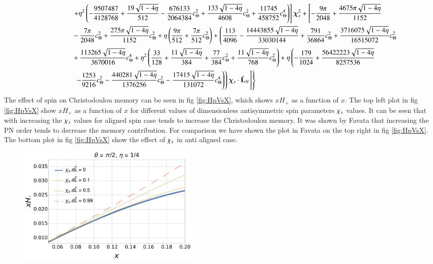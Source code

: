 \documentclass[twocolumn,showpacs,aps,prd,nobibnotes,floatfix]{revtex4-1}
\begin{document}
\begin{widetext}
\begin{subequations}
\begin{align}
	& \qquad\qquad\quad \left.+ \eta^2\left(-\frac{9507487}{4128768} + \frac{19\sqrt{1-4\eta}}{512} - \frac{676133}{2064384}c_{\Theta}^2 +\frac{133\sqrt{1-4\eta}}{4608}c_{\Theta}^2+ \frac{11745}{458752}c_{\Theta}^4\right)\right]\bm{\chi}_s^2 + \left[-\frac{9\pi}{2048} + \frac{4675\pi\sqrt{1-4\eta}}{1152}\right.\nonumber\\
	& \qquad\qquad\quad - \frac{7\pi}{2048}c_{\Theta}^2 + \frac{275\pi\sqrt{1-4\eta}}{1152}c_{\Theta}^2 + \eta\left(\frac{9\pi}{512} + \frac{7\pi}{512}c_{\Theta}^2\right) + \left(\frac{113}{4096} -\frac{14443855\sqrt{1-4\eta}}{33030144} + \frac{791}{36864}c_{\Theta}^2 + \frac{3716075\sqrt{1-4\eta}}{16515072}c_{\Theta}^2\right.\nonumber\\
	 & \qquad\qquad\quad +\frac{113265\sqrt{1-4\eta}}{3670016}c_{\Theta}^4 + \eta^2\left(\frac{33}{128} + \frac{11\sqrt{1-4\eta}}{384} + \frac{77}{384}c_{\Theta}^2 + \frac{11\sqrt{1-4\eta}}{768}c_{\Theta}^2\right) + \eta\left(-\frac{179}{1024} + \frac{56422223\sqrt{1-4\eta}}{8257536}\right.\nonumber\\
	 & \qquad\qquad\quad \left.\left.\left.\left. -\frac{1253}{9216}c_{\Theta}^2 -\frac{440281\sqrt{1-4\eta}}{1376256}c_{\Theta}^2 -\frac{17415\sqrt{1-4\eta}}{131072}c_{\Theta}^4\right)\right)\bm{\chi}_s \cdot \hat{\mathbf{L}}_N\right]\right\}
\end{align}
\end{subequations}
The effect of spin on Christodoulou memory can be seen in fig \ref{fig:HpVsX}, which shows $xH_+$ as a function of $x$. The top left plot in fig \ref{fig:HpVsX} show $xH_+$ as a function of $x$ for different values of dimensionless antisymmetric spin parameters $\chi_s$ values. It can be seen that with increasing the $\chi_s$ values for aligned spin case tends to increase the Christodoulou memory. It was shown by Favata \cite{Favata2009} that increasing the PN order tends to decrease the memory contribution. For comparison we have shown the plot in Favata \cite{Favata2009} on the top right in fig \ref{fig:HpVsX}. The bottom plot in fig \ref{fig:HpVsX} show the effect of $\chi_s$ in anti aligned case.   
\begin{figure}
	\includegraphics[width=3.5in]{../plots/PNmemorycontributionHpAlginedSpin.pdf}

\end{figure}
\end{widetext}
\end{document}
